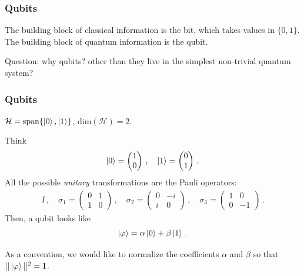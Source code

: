 \documentclass[12pt, aspectratio=169]{beamer}
\begin{document}
\begin{frame}
    \frametitle{Qubits}
    The building block of classical information is the bit, which takes values in 
    $\{0,1\}$.
    The building block of quantum information is the qubit.

    \pause

    Question: why qubits? other than they live in the simplest non-trivial quantum system?

\end{frame}

\begin{frame}
    \frametitle{Qubits}
    $\mathcal{H} = \mathrm{span}\{\ket{0}, \ket{1}\}$,
    $\mathrm{dim}(\mathcal{H}) = 2$.

    Think 
    \begin{equation*}
        \ket{0} = \begin{pmatrix}
            1 \\ 0
        \end{pmatrix} \,, \quad 
            \ket{1} =
        \begin{pmatrix}
            0 \\1 
        \end{pmatrix}\,.
    \end{equation*}
    All the possible \emph{unitary} transformations are the Pauli operators:
    \begin{gather*}
        I \,, \quad \sigma_1 = \begin{pmatrix}
            0 & 1 \\ 1 & 0
        \end{pmatrix} \,,
        \quad \sigma_2 = \begin{pmatrix}
            0 & -i \\ i & 0
        \end{pmatrix} \,,
        \quad \sigma_3 = \begin{pmatrix}
            1 & 0 \\ 0 &-1 
        \end{pmatrix} \,.
    \end{gather*}
    Then, a qubit looks like
    \begin{equation*}
        \ket{\varphi} = \alpha \ket{0} + \beta \ket{1} \,.
    \end{equation*}

    As a convention, we would like to normalize the coefficients $\alpha$ and $\beta$
    so that $|| \ket{\varphi} ||^2 = 1$.
     
\end{frame}
\end{document}
